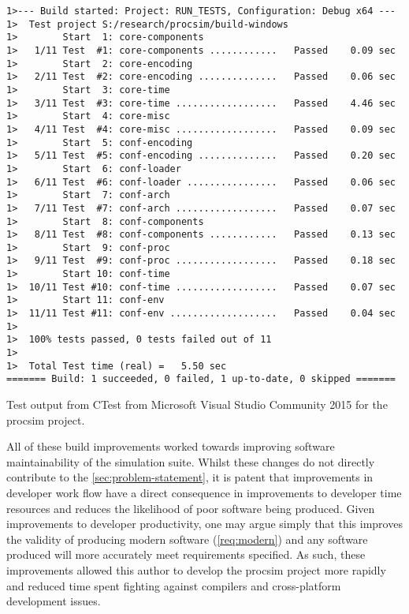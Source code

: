 \begin{listing}[hb!]
\begin{verbatim}
1>--- Build started: Project: RUN_TESTS, Configuration: Debug x64 ---
1>  Test project S:/research/procsim/build-windows
1>        Start  1: core-components
1>   1/11 Test  #1: core-components ............   Passed    0.09 sec
1>        Start  2: core-encoding
1>   2/11 Test  #2: core-encoding ..............   Passed    0.06 sec
1>        Start  3: core-time
1>   3/11 Test  #3: core-time ..................   Passed    4.46 sec
1>        Start  4: core-misc
1>   4/11 Test  #4: core-misc ..................   Passed    0.09 sec
1>        Start  5: conf-encoding
1>   5/11 Test  #5: conf-encoding ..............   Passed    0.20 sec
1>        Start  6: conf-loader
1>   6/11 Test  #6: conf-loader ................   Passed    0.06 sec
1>        Start  7: conf-arch
1>   7/11 Test  #7: conf-arch ..................   Passed    0.07 sec
1>        Start  8: conf-components
1>   8/11 Test  #8: conf-components ............   Passed    0.13 sec
1>        Start  9: conf-proc
1>   9/11 Test  #9: conf-proc ..................   Passed    0.18 sec
1>        Start 10: conf-time
1>  10/11 Test #10: conf-time ..................   Passed    0.07 sec
1>        Start 11: conf-env
1>  11/11 Test #11: conf-env ...................   Passed    0.04 sec
1>
1>  100% tests passed, 0 tests failed out of 11
1>
1>  Total Test time (real) =   5.50 sec
======= Build: 1 succeeded, 0 failed, 1 up-to-date, 0 skipped =======
\end{verbatim}
\caption{Test output from CTest \cite{CMake:CTest} from Microsoft Visual Studio Community 2015 for the procsim project.}
\label{lst:lua:ctest-output}
\end{listing}  

All of these build improvements worked towards improving software maintainability of the simulation suite. Whilst these changes do not directly contribute to the \cref{sec:problem-statement}, it is patent that improvements in developer work flow have a direct consequence in improvements to developer time resources and reduces the likelihood of poor software being produced. Given improvements to developer productivity, one may argue simply that this improves the validity of producing modern software (\cref{req:modern}) and any software produced will more accurately meet requirements specified. As such, these improvements allowed this author to develop the procsim project more rapidly and reduced time spent fighting against compilers and cross-platform development issues.


